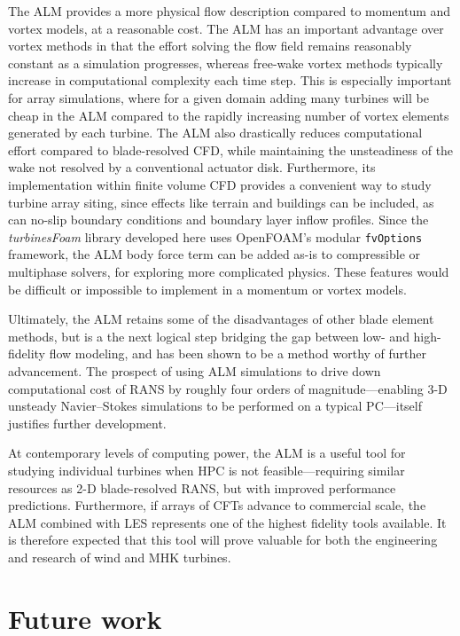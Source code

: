 The ALM provides a more physical flow description compared to momentum and
vortex models, at a reasonable cost. The ALM has an important advantage over
vortex methods in that the effort solving the flow field remains reasonably
constant as a simulation progresses, whereas free-wake vortex methods typically
increase in computational complexity each time step. This is especially
important for array simulations, where for a given domain adding many turbines
will be cheap in the ALM compared to the rapidly increasing number of vortex
elements generated by each turbine. The ALM also drastically reduces
computational effort compared to blade-resolved CFD, while maintaining the
unsteadiness of the wake not resolved by a conventional actuator disk.
Furthermore, its implementation within finite volume CFD provides a convenient
way to study turbine array siting, since effects like terrain and buildings can
be included, as can no-slip boundary conditions and boundary layer inflow
profiles. Since the \textit{turbinesFoam} library developed here uses OpenFOAM's
modular \texttt{fvOptions} framework, the ALM body force term can be added as-is
to compressible or multiphase solvers, for exploring more complicated physics.
These features would be difficult or impossible to implement in a momentum or
vortex models.

Ultimately, the ALM retains some of the disadvantages of other blade element
methods, but is a the next logical step bridging the gap between low- and
high-fidelity flow modeling, and has been shown to be a method worthy of further
advancement. The prospect of using ALM simulations to drive down computational
cost of RANS by roughly four orders of magnitude---enabling 3-D unsteady
Navier--Stokes simulations to be performed on a typical PC---itself justifies
further development.

At contemporary levels of computing power, the ALM is a useful tool for studying
individual turbines when HPC is not feasible---requiring similar resources as
2-D blade-resolved RANS, but with improved performance predictions. Furthermore,
if arrays of CFTs advance to commercial scale, the ALM combined with LES
represents one of the highest fidelity tools available. It is therefore expected
that this tool will prove valuable for both the engineering and research of wind
and MHK turbines.


\section{Future work}


